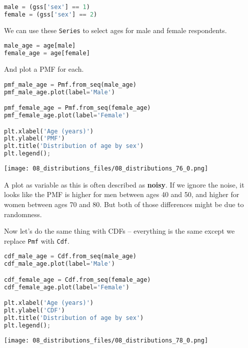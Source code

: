 \begin{lstlisting}[language=Python,style=source]
male = (gss['sex'] == 1)
female = (gss['sex'] == 2)
\end{lstlisting}

We can use these \passthrough{\lstinline!Series!} to select ages for
male and female respondents.

\begin{lstlisting}[language=Python,style=source]
male_age = age[male]
female_age = age[female]
\end{lstlisting}

And plot a PMF for each.

\begin{lstlisting}[language=Python,style=source]
pmf_male_age = Pmf.from_seq(male_age)
pmf_male_age.plot(label='Male')

pmf_female_age = Pmf.from_seq(female_age)
pmf_female_age.plot(label='Female')

plt.xlabel('Age (years)') 
plt.ylabel('PMF')
plt.title('Distribution of age by sex')
plt.legend();
\end{lstlisting}

\begin{center}
\texttt{[image: 08\_distributions\_files/08\_distributions\_76\_0.png]}
\end{center}

A plot as variable as this is often described as \textbf{noisy}. If we
ignore the noise, it looks like the PMF is higher for men between ages
40 and 50, and higher for women between ages 70 and 80. But both of
those differences might be due to randomness.

Now let's do the same thing with CDFs -- everything is the same except
we replace \passthrough{\lstinline!Pmf!} with
\passthrough{\lstinline!Cdf!}.

\begin{lstlisting}[language=Python,style=source]
cdf_male_age = Cdf.from_seq(male_age)
cdf_male_age.plot(label='Male')

cdf_female_age = Cdf.from_seq(female_age)
cdf_female_age.plot(label='Female')

plt.xlabel('Age (years)') 
plt.ylabel('CDF')
plt.title('Distribution of age by sex')
plt.legend();
\end{lstlisting}

\begin{center}
\texttt{[image: 08\_distributions\_files/08\_distributions\_78\_0.png]}
\end{center}

